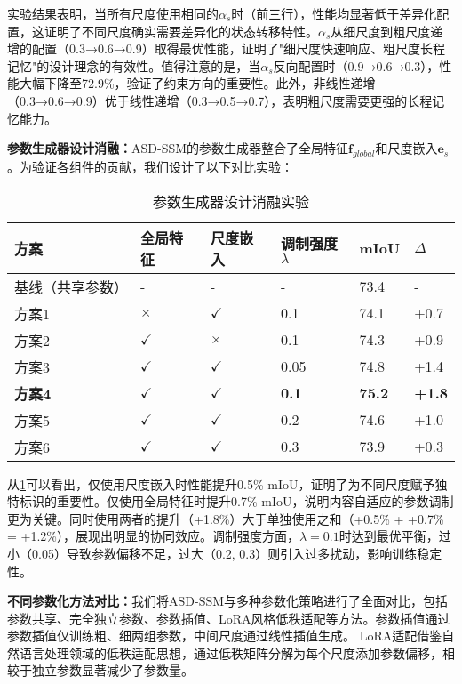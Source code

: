 \documentclass[preprint,12pt]{elsarticle}
\begin{document}
实验结果表明，当所有尺度使用相同的$\alpha_s$时（前三行），性能均显著低于差异化配置，这证明了不同尺度确实需要差异化的状态转移特性。$\alpha_s$从细尺度到粗尺度递增的配置（0.3→0.6→0.9）取得最优性能，证明了"细尺度快速响应、粗尺度长程记忆"的设计理念的有效性。值得注意的是，当$\alpha_s$反向配置时（0.9→0.6→0.3），性能大幅下降至72.9\%，验证了约束方向的重要性。此外，非线性递增（0.3→0.6→0.9）优于线性递增（0.3→0.5→0.7），表明粗尺度需要更强的长程记忆能力。

\textbf{参数生成器设计消融：}ASD-SSM的参数生成器整合了全局特征$\mathbf{f}_{global}$和尺度嵌入$\mathbf{e}_s$。为验证各组件的贡献，我们设计了以下对比实验：

\begin{table}[htbp!]
	\centering
	\caption{参数生成器设计消融实验}
	\label{tab:paramgen_design}
	\begin{tabular}{@{}llllll@{}}
		\toprule
		方案 & 全局特征 & 尺度嵌入 & 调制强度$\lambda$ & mIoU & $\Delta$ \\ 
		\midrule
		基线（共享参数） & - & - & - & 73.4 & - \\
		\midrule
		方案1 & $\times$ & $\checkmark$ & 0.1 & 74.1 & +0.7 \\
		方案2 & $\checkmark$ & $\times$ & 0.1 & 74.3 & +0.9 \\
		方案3 & $\checkmark$ & $\checkmark$ & 0.05 & 74.8 & +1.4 \\
		\textbf{方案4} & $\checkmark$ & $\checkmark$ & \textbf{0.1} & \textbf{75.2} & \textbf{+1.8} \\
		方案5 & $\checkmark$ & $\checkmark$ & 0.2 & 74.6 & +1.0 \\
		方案6 & $\checkmark$ & $\checkmark$ & 0.3 & 73.9 & +0.3 \\
		\bottomrule
	\end{tabular}
\end{table}

从\cref{tab:paramgen_design}可以看出，仅使用尺度嵌入时性能提升0.5\% mIoU，证明了为不同尺度赋予独特标识的重要性。仅使用全局特征时提升0.7\% mIoU，说明内容自适应的参数调制更为关键。同时使用两者的提升（+1.8\%）大于单独使用之和（+0.5\% + +0.7\% = +1.2\%），展现出明显的协同效应。调制强度方面，$\lambda=0.1$时达到最优平衡，过小（0.05）导致参数偏移不足，过大（0.2, 0.3）则引入过多扰动，影响训练稳定性。

\textbf{不同参数化方法对比：}我们将ASD-SSM与多种参数化策略进行了全面对比，包括参数共享、完全独立参数、参数插值、LoRA风格低秩适配等方法。参数插值通过参数插值仅训练粗、细两组参数，中间尺度通过线性插值生成。
LoRA适配借鉴自然语言处理领域的低秩适配思想\cite{lora}，通过低秩矩阵分解为每个尺度添加参数偏移，相较于独立参数显著减少了参数量。
\end{document}
